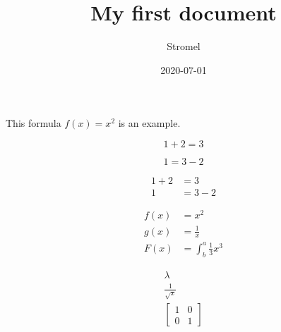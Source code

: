 \documentclass{article}
\title{My first document}
\date{2020-07-01}
\author{Stromel}
\begin{document}
	\maketitle
	
	This formula $f(x) = x^2$ is an example.
	
	\begin{equation*}
		1 + 2 = 3
	\end{equation*}

	\begin{equation*}
		1 = 3 - 2
	\end{equation*}

	\begin{align*}
		1 + 2 &= 3 \\
		1 &= 3 - 2
	\end{align*}
	
	\begin{align*}
		f(x) &= x^2 \\
		g(x) &= \frac{1}{x} \\
		F(x) &= \int^a_b \frac{1}{3}x^3
	\end{align*}
	
	\begin{align}
		\lambda \\
		\frac{1}{\sqrt{x}} \\
		\left[
		\begin{matrix}
			1 & 0 \\
			0 & 1
		\end{matrix}
		\right]
	\end{align}
\end{document}
